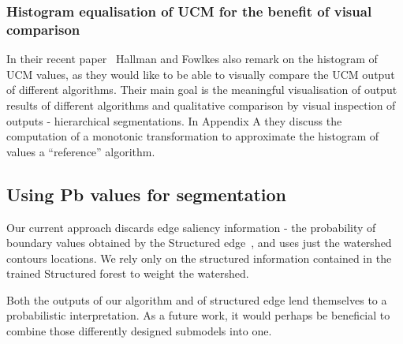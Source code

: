 \subsubsection{Histogram equalisation of UCM for the benefit of visual comparison}
In their recent paper~\cite{Hallman2014} Hallman and Fowlkes also remark on the histogram of UCM values, as they would like to be able to visually compare the UCM output of different algorithms. Their main goal is the meaningful visualisation of output results of different algorithms and qualitative comparison by visual inspection of outputs - hierarchical segmentations. In Appendix A they discuss the computation of a monotonic transformation to approximate the histogram of values \wrt a ``reference'' algorithm.

\subsection{Using Pb values for segmentation} %
Our current approach discards edge saliency information - the probability of boundary values obtained by the Structured edge~\cite{DollarICCV13edges}, and uses just the watershed contours locations. We rely only on the structured information contained in the trained Structured forest to weight the watershed.

Both the outputs of our algorithm and of structured edge lend themselves to %
a probabilistic interpretation. As a future work, it would perhaps be beneficial to combine those differently designed submodels into one.
